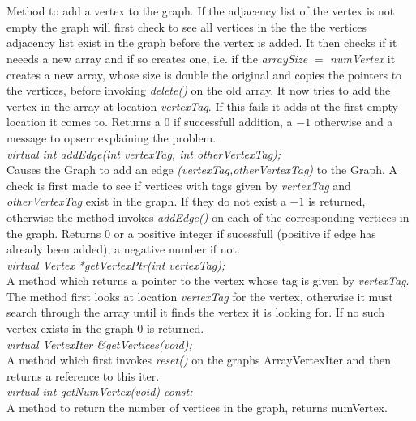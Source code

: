   \\
  \\
Method to add a vertex to the graph. If the adjacency list
of the vertex is not empty the graph will first check to see all
vertices in the the the vertices adjacency list exist in the graph
before the vertex is added. It then checks if it neeeds a new array
and if so creates one, i.e. if the {\em arraySize} $=$ {\em
numVertex} it creates a new array, whose size is double the original
and copies the pointers to the vertices, before invoking {\em
delete()} on the old array. It now tries to add the vertex in the
array at location {\em vertexTag}. If this fails it adds at the first
empty location it comes to. Returns a 0 if successfull addition, a
$-1$ otherwise and a message to opserr explaining the problem. \\ 

{\em virtual int addEdge(int vertexTag, int otherVertexTag); } \\
Causes the Graph to add an edge {\em (vertexTag,otherVertexTag)} to
the Graph. A check is first made to see if vertices with tags given by
{\em vertexTag} and {\em otherVertexTag} exist in the graph. If they
do not exist a $-1$ is returned, otherwise the method invokes {\em
addEdge()} on each of the corresponding vertices in the 
graph. Returns $0$ or a positive integer if sucessfull (positive if
edge has already been added), a negative number if not.\\ 


{\em virtual Vertex *getVertexPtr(int vertexTag);} \\
A method which returns a pointer to the vertex whose tag is given by {\em
vertexTag}. The method first looks at location {\em vertexTag} for the
vertex, otherwise it must search through the array until it finds the
vertex it is looking for. If no such vertex exists in the graph $0$ is
returned.\\ 

{\em virtual VertexIter \&getVertices(void);} \\
A method which first invokes {\em reset()} on the graphs ArrayVertexIter
and then returns a reference to this iter.\\

{\em virtual int getNumVertex(void) const;} \\
A method to return the number of vertices in the graph, returns numVertex. \\

